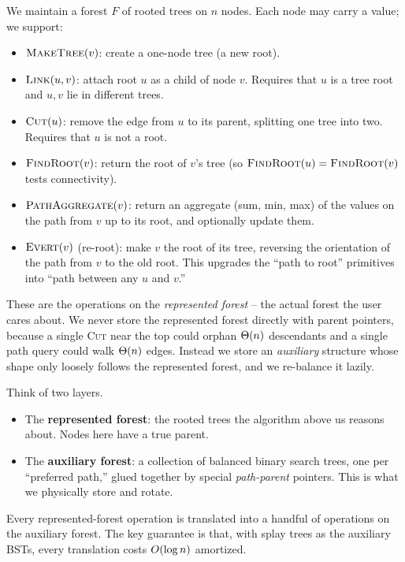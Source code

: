\begin{focusbox}
We maintain a forest $F$ of rooted trees on $n$ nodes. Each node may carry a
value; we support:
\begin{itemize}
  \item $\textsc{MakeTree}(v)$: create a one-node tree (a new root).
  \item $\textsc{Link}(u,v)$: attach root $u$ as a child of node $v$. Requires
        that $u$ is a tree root and $u,v$ lie in different trees.
  \item $\textsc{Cut}(u)$: remove the edge from $u$ to its parent, splitting one
        tree into two. Requires that $u$ is not a root.
  \item $\textsc{FindRoot}(v)$: return the root of $v$'s tree (so
        $\textsc{FindRoot}(u)=\textsc{FindRoot}(v)$ tests connectivity).
  \item $\textsc{PathAggregate}(v)$: return an aggregate (sum, min, max) of the
        values on the path from $v$ up to its root, and optionally update them.
  \item $\textsc{Evert}(v)$ (re-root): make $v$ the root of its tree, reversing
        the orientation of the path from $v$ to the old root. This upgrades the
        ``path to root'' primitives into ``path between any $u$ and $v$.''
\end{itemize}
\end{focusbox}

These are the operations on the \emph{represented forest} -- the actual forest
the user cares about. We never store the represented
forest directly with parent pointers, because a single \textsc{Cut} near the top
could orphan $\Theta(n)$ descendants and a single path query could walk $\Theta(n)$
edges. Instead we store an \emph{auxiliary} structure whose shape only loosely
follows the represented forest, and we re-balance it lazily.

\begin{intuitionbox}
Think of two layers.
\begin{itemize}
  \item The \textbf{represented forest}: the rooted trees the algorithm above us
        reasons about. Nodes here have a true parent.
  \item The \textbf{auxiliary forest}: a collection of balanced binary search
        trees, one per ``preferred path,'' glued together by special
        \emph{path-parent} pointers. This is what we physically store and
        rotate.
\end{itemize}
Every represented-forest operation is translated into a handful of operations on
the auxiliary forest. The key guarantee is that, with splay trees as the
auxiliary BSTs, every translation costs $O(\log n)$ amortized.
\end{intuitionbox}

